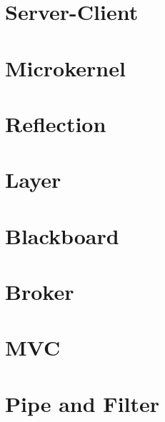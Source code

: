 \section{Server-Client}

\section{Microkernel}

\section{Reflection}

\section{Layer}

\section{Blackboard}

\section{Broker}

\section{MVC}

\section{Pipe and Filter}
